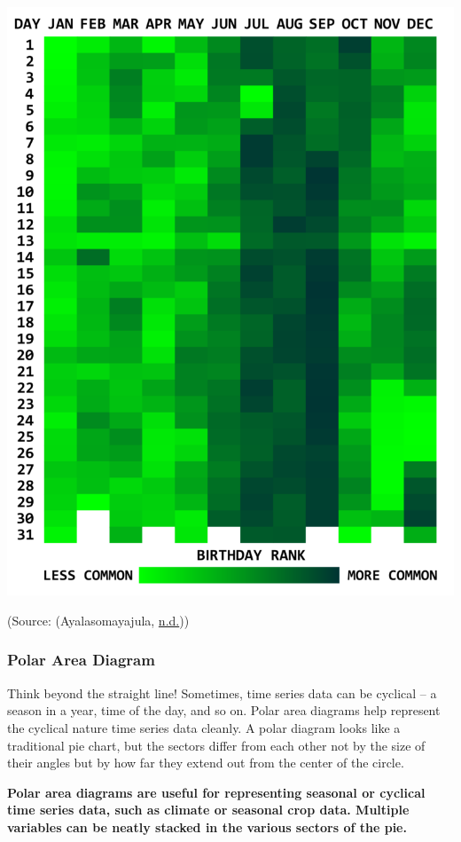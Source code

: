 \documentclass[]{book}
\begin{document}
\includegraphics{images/aya-heat-map.png}

(Source: (Ayalasomayajula, \protect\hyperlink{ref-aya-time-series}{n.d.}))

\hypertarget{polar-area-diagram}{%
\subsubsection{Polar Area Diagram}\label{polar-area-diagram}}

Think beyond the straight line! Sometimes, time series data can be cyclical -- a season in a year, time of the day, and so on. Polar area diagrams help represent the cyclical nature time series data cleanly. A polar diagram looks like a traditional pie chart, but the sectors differ from each other not by the size of their angles but by how far they extend out from the center of the circle.

\textbf{Polar area diagrams are useful for representing seasonal or cyclical time series data, such as climate or seasonal crop data. Multiple variables can be neatly stacked in the various sectors of the pie.}
\end{document}
